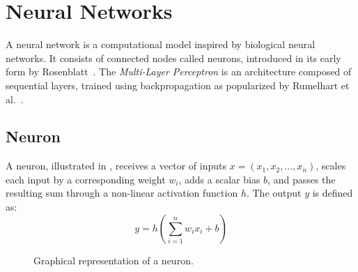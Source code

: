 \section{Neural Networks}
\label{sec:neural-networks}

A neural network is a computational model inspired by biological neural networks. It consists of
connected nodes called neurons, introduced in its early form by Rosenblatt~\cite{rosenblatt1958perceptron}.
The \textit{Multi-Layer Perceptron} is an architecture composed of sequential layers, trained using
backpropagation as popularized by Rumelhart et al.~\cite{rumelhart1986learning}.

\subsection{Neuron}
A neuron, illustrated in \textbf{}, receives a vector of inputs $x = (x_1, x_2, \dots, x_n)$, scales each input by a corresponding weight $w_i$,
adds a scalar bias $b$, and passes the resulting sum through a non-linear activation function $h$.
The output $y$ is defined as:
\begin{equation}
    y = h\left( \sum_{i=1}^{n} w_i x_i + b \right)
\end{equation}

\begin{figure}[H]
    \centering
    \caption{Graphical representation of a neuron.}
    \label{fig:single-neuron}
\end{figure}

